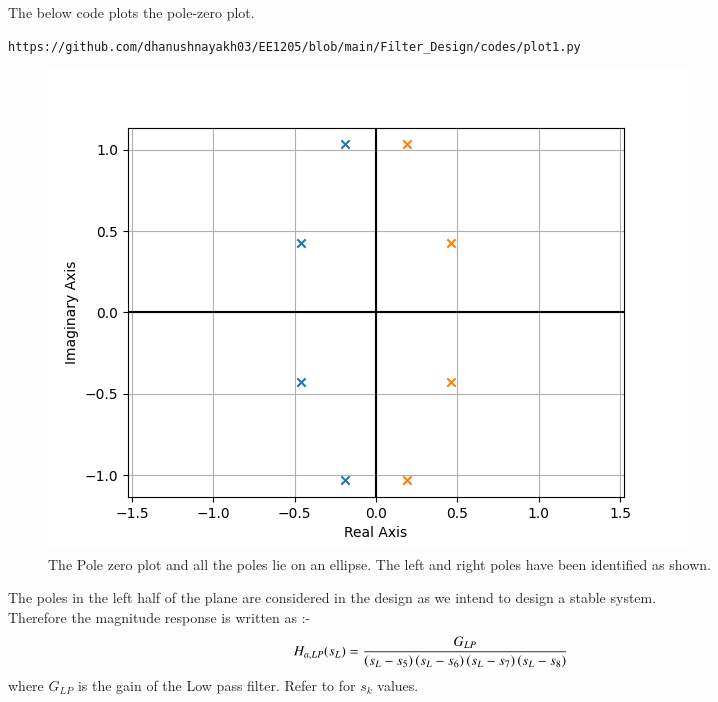 \documentclass{article}
\begin{document}
\begin{enumerate}
The below code plots the pole-zero plot.
\begin{lstlisting}
https://github.com/dhanushnayakh03/EE1205/blob/main/Filter_Design/codes/plot1.py
\end{lstlisting}
\begin{figure}[ht]
\centering
\includegraphics[width=1\columnwidth]{figs/polezero.png}
\caption{The Pole zero plot and all the poles lie on an ellipse. The left and right poles have been identified as shown.}
\label{fig:pole_zero_plt}
\end{figure}
The poles in the left half of the plane are considered in the design as we intend to design a stable system.\\
Therefore the magnitude response is written as :-
\begin{align}
    H_{a,LP}(s_L) &= \frac{G_{LP}}{\left(s_L-s_5\right)\left(s_L-s_6\right)\left(s_L-s_7\right)\left(s_L-s_8\right)}
\end{align}
where $G_{LP}$ is the gain of the Low pass filter. Refer to  for $s_k$ values.\\


\end{enumerate}
\end{document}
